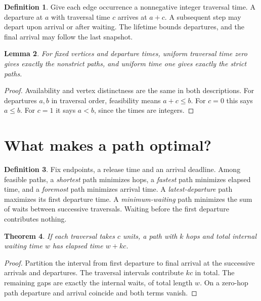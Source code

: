\documentclass[11pt]{article}
\newtheorem{theorem}{Theorem}
\newtheorem{lemma}[theorem]{Lemma}
\theoremstyle{definition}
\newtheorem{definition}[theorem]{Definition}
\begin{document}
\begin{definition}
Give each edge occurrence a nonnegative integer traversal time. A departure
at $a$ with traversal time $c$ arrives at $a+c$. A subsequent step may
depart upon arrival or after waiting. The lifetime bounds departures, and
the final arrival may follow the last snapshot.
\end{definition}

\begin{lemma}
For fixed vertices and departure times, uniform traversal time zero gives
exactly the nonstrict paths, and uniform time one gives exactly the strict paths.
\end{lemma}

\begin{proof}
Availability and vertex distinctness are the same in both descriptions.
For departures $a,b$ in traversal order, feasibility means $a+c\le b$.
For $c=0$ this says $a\le b$. For $c=1$ it says $a<b$, since the times
are integers.
\end{proof}

\newpage
\section{What makes a path optimal?}

\begin{definition}
Fix endpoints, a release time and an arrival deadline. Among feasible paths,
a \emph{shortest} path minimizes hops, a \emph{fastest} path minimizes
elapsed time, and a \emph{foremost} path minimizes arrival time.
A \emph{latest-departure} path maximizes its first departure time.
A \emph{minimum-waiting} path minimizes the sum of waits between successive
traversals. Waiting before the first departure contributes nothing.
\end{definition}

\begin{theorem}
If each traversal takes $c$ units, a path with $k$ hops and total internal
waiting time $w$ has elapsed time $w+kc$.
\end{theorem}

\begin{proof}
Partition the interval from first departure to final arrival at the
successive arrivals and departures. The traversal intervals contribute
$kc$ in total. The remaining gaps are exactly the internal waits, of total
length $w$. On a zero-hop path departure and arrival coincide and both
terms vanish.
\end{proof}
\end{document}

